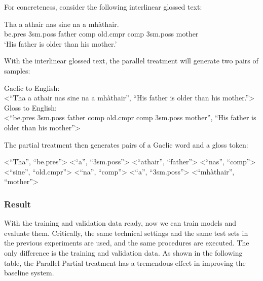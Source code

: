 \documentclass[a4paper]{article}
\begin{document}
For concreteness, consider the following interlinear glossed text: 
\begin{exe}  
\ex \gll    Tha a athair nas sine na a mh\`athair.\\  
            be.pres 3sm.poss father comp old.cmpr comp 3sm.poss mother\\  
    \glt    `His father is older than his mother.'  
\end{exe}

With the interlinear glossed text, the parallel treatment will generate two pairs of samples:

\begin{exe}
	\ex
	\begin{xlist}
		\ex Gaelic to English: \\<``Tha a athair nas sine na a mh\`athair'', ``His father is older than his mother.''>
		\ex Gloss to English: \\<``be.pres 3sm.poss father comp old.cmpr comp 3sm.poss mother'', ``His father is older than his mother''>
	\end{xlist}
\end{exe}

The partial treatment then generates pairs of a Gaelic word and a gloss token: 
\begin{exe}
	\ex
	\begin{xlist}
		\ex <``Tha'', ``be.pres''>
		\ex <``a'', ``3sm.poss''>
		\ex <``athair'', ``father''>
		\ex <``nas'', ``comp''>
		\ex <``sine'', ``old.cmpr''>
		\ex <``na'', ``comp''>
		\ex <``a'', ``3sm.poss''>
		\ex <``mh\`athair'', ``mother''>
	\end{xlist}
\end{exe}

\subsubsection{Result}

With the training and validation data ready, now we can train models and evaluate them. Critically, the same technical settings and the same test sets in the previous experiments are used, and the same procedures are executed. The only difference is the training and validation data. As shown in the following table, the Parallel-Partial treatment has a tremendous effect in improving the baseline system.        
\end{document}
